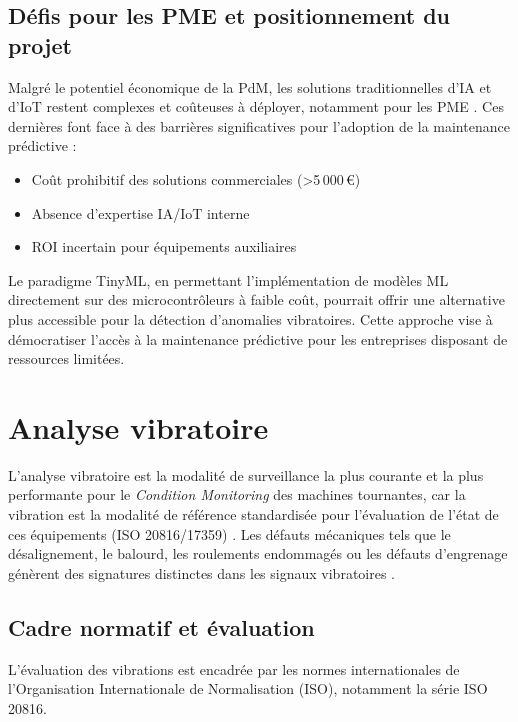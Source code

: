 \subsection{Défis pour les PME et positionnement du projet}

Malgré le potentiel économique de la PdM, les solutions traditionnelles d'IA et d'IoT restent complexes et coûteuses à déployer, notamment pour les PME \cite{siemens2024}. Ces dernières font face à des barrières significatives pour l'adoption de la maintenance prédictive \cite{oecd2021} :
\begin{itemize}
\item Coût prohibitif des solutions commerciales (>5\,000\,€)
\item Absence d'expertise IA/IoT interne
\item ROI incertain pour équipements auxiliaires
\end{itemize}

Le paradigme TinyML, en permettant l'implémentation de modèles ML directement sur des microcontrôleurs à faible coût, pourrait offrir une alternative plus accessible pour la détection d'anomalies vibratoires. Cette approche vise à démocratiser l'accès à la maintenance prédictive pour les entreprises disposant de ressources limitées.

\section{Analyse vibratoire}
\label{sec:analyse_vibratoire}

L'analyse vibratoire est la modalité de surveillance la plus courante et la plus performante pour le \textit{Condition Monitoring} des machines tournantes, car la vibration est la modalité de référence standardisée pour l'évaluation de l'état de ces équipements (ISO 20816/17359) \cite{iso20816-1,hassan2024}. Les défauts mécaniques tels que le désalignement, le balourd, les roulements endommagés ou les défauts d'engrenage génèrent des signatures distinctes dans les signaux vibratoires \cite{tiboni2022}.

\subsection{Cadre normatif et évaluation}

L'évaluation des vibrations est encadrée par les normes internationales de l'Organisation Internationale de Normalisation (ISO), notamment la série ISO 20816.

